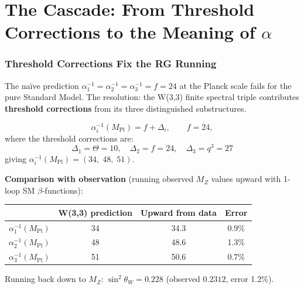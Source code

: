 \clearpage
\part{The Cascade: From Threshold Corrections to the Meaning of $\alpha$}

\section{Threshold Corrections Fix the RG Running}
\label{sec:threshold}

The na\"ive prediction $\alpha_1^{-1}=\alpha_2^{-1}=\alpha_3^{-1}=f=24$
at the Planck scale fails for the pure Standard Model.
The resolution: the W(3,3) finite spectral triple contributes
\textbf{threshold corrections} from its three distinguished substructures.

\begin{theorem}
\label{thm:threshold}
\begin{equation}
\alpha_i^{-1}(M_{\mathrm{Pl}}) = f + \Delta_i, \qquad
f = 24,
\end{equation}
where the threshold corrections are:
\begin{equation}
\boxed{
\Delta_1 = \Theta = 10, \quad
\Delta_2 = f = 24, \quad
\Delta_3 = q^3 = 27
}
\end{equation}
giving $\alpha_i^{-1}(M_{\mathrm{Pl}}) = (34,\;48,\;51)$.
\end{theorem}

\noindent\textbf{Comparison with observation} (running observed $M_Z$ values
upward with 1-loop SM $\beta$-functions):
\begin{center}
\begin{tabular}{@{}lccc@{}}
\toprule
& W(3,3) prediction & Upward from data & Error \\
\midrule
$\alpha_1^{-1}(M_{\mathrm{Pl}})$ & 34 & 34.3 & 0.9\% \\
$\alpha_2^{-1}(M_{\mathrm{Pl}})$ & 48 & 48.6 & 1.3\% \\
$\alpha_3^{-1}(M_{\mathrm{Pl}})$ & 51 & 50.6 & 0.7\% \\
\bottomrule
\end{tabular}
\end{center}

Running back down to $M_Z$: $\sin^2\theta_W = 0.228$
(observed $0.2312$, error 1.2\%).

